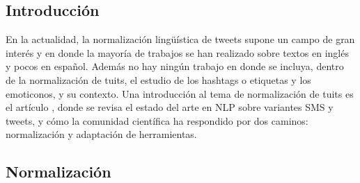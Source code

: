 \documentclass[spanish,12pt, a4paper,twoside]{paper}
\begin{document}
\subsection{Introducción}\label{introduccion}
En la actualidad, la normalización lingüística de tweets \cite{baldwin:2011} supone un campo de gran interés y en donde la mayoría de trabajos se han realizado sobre textos en inglés y pocos en español. Además no hay ningún trabajo en donde se incluya, dentro de la normalización de tuits, el estudio de los hashtags o etiquetas y los emoticonos, y su contexto. 
Una introducción al tema de normalización de tuits es el artículo \cite{eisenstein:2013}, donde se revisa el estado del arte en NLP sobre variantes SMS y tweets, y cómo la comunidad científica ha respondido por dos caminos: normalización y adaptación de herramientas.
\subsection{Normalización}\label{normalizacion}
\end{document}
